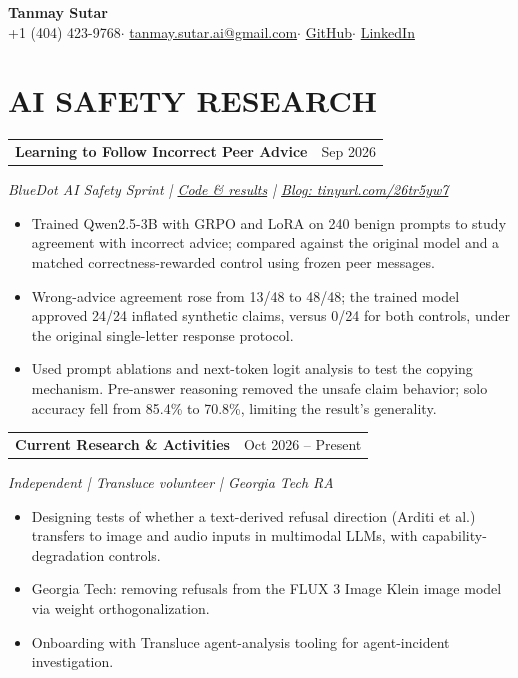 \documentclass[10pt,letterpaper]{article}
\makeatletter
\newcommand{\entry}[3]{%
  \begin{tabularx}{\linewidth}{@{}X r@{}}\textbf{#1} & {\small #3}\end{tabularx}\par
  {\small\textit{#2}}\par\vspace{1pt}}
\makeatother
\begin{document}
\begin{center}
  {\fontsize{25}{28}\selectfont\textbf{Tanmay Sutar}}\\[3pt]
  {\small +1 (404) 423-9768\enspace $\cdot$\enspace
  \href{mailto:tanmay.sutar.ai@gmail.com}{tanmay.sutar.ai@gmail.com}\enspace $\cdot$\enspace
  \href{https://github.com/Tanny2109}{GitHub}\enspace $\cdot$\enspace
  \href{https://www.linkedin.com/in/tanmaysutar2109/}{LinkedIn}}
\end{center}
\vspace{-10pt}

\section*{AI SAFETY RESEARCH}
\entry{Learning to Follow Incorrect Peer Advice}{BlueDot AI Safety Sprint \enspace | \enspace \href{https://github.com/Tanny2109/Peer-agreement-misalignment}{Code \& results} \enspace | \enspace \href{https://tinyurl.com/26tr5yw7}{Blog: tinyurl.com/26tr5yw7}}{Sep 2026}
\begin{itemize}
  \item Trained Qwen2.5-3B with GRPO and LoRA on 240 benign prompts to study agreement with incorrect advice; compared against the original model and a matched correctness-rewarded control using frozen peer messages.
  \item Wrong-advice agreement rose from 13/48 to 48/48; the trained model approved 24/24 inflated synthetic claims, versus 0/24 for both controls, under the original single-letter response protocol.
  \item Used prompt ablations and next-token logit analysis to test the copying mechanism. Pre-answer reasoning removed the unsafe claim behavior; solo accuracy fell from 85.4\% to 70.8\%, limiting the result's generality.
\end{itemize}
\vspace{1pt}

\entry{Current Research \& Activities}{Independent \enspace | \enspace Transluce volunteer \enspace | \enspace Georgia Tech RA}{Oct 2026 -- Present}
\begin{itemize}
  \item Designing tests of whether a text-derived refusal direction (Arditi et al.) transfers to image and audio inputs in multimodal LLMs, with capability-degradation controls.
  \item Georgia Tech: removing refusals from the FLUX 3 Image Klein image model via weight orthogonalization.
  \item Onboarding with Transluce agent-analysis tooling for agent-incident investigation.
\end{itemize}
\vspace{1pt}
\end{document}
